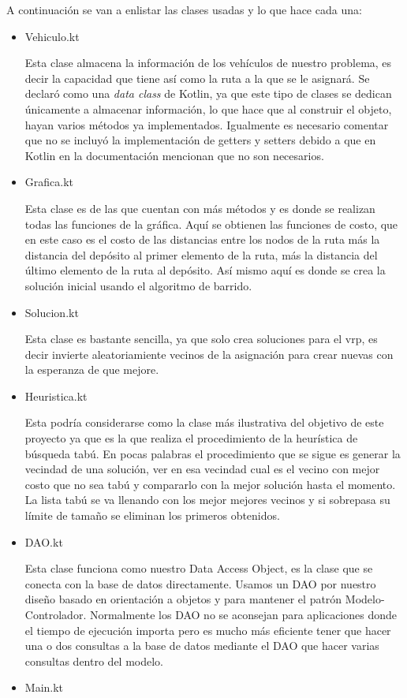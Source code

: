 \documentclass{article}
\begin{document}
A continuación se van a enlistar las clases usadas y lo que hace cada una:
\begin{itemize}
	\item {Vehiculo.kt
		
		Esta clase almacena la información de los vehículos de nuestro problema, es decir la capacidad que tiene así como la ruta a la que se le asignará. Se declaró como una \emph{data class} de Kotlin, ya que este tipo de clases se dedican únicamente a almacenar información, lo que hace que al construir el objeto, hayan varios métodos ya implementados. Igualmente es necesario comentar que no se incluyó la implementación de getters y setters debido a que en Kotlin en la documentación mencionan que no son necesarios.
	}
	\item {Grafica.kt
		
		Esta clase es de las que cuentan con más métodos y es donde se realizan todas las funciones de la gráfica. Aquí se obtienen las funciones de costo, que en este caso es el costo de las distancias entre los nodos de la ruta más la distancia del depósito al primer elemento de la ruta, más la distancia del último elemento de la ruta al depósito. Así mismo aquí es donde se crea la solución inicial usando el algoritmo de barrido.
	}
	\item {Solucion.kt
		
		Esta clase es bastante sencilla, ya que solo crea soluciones para el vrp, es decir invierte aleatoriamiente vecinos de la asignación para crear nuevas con la esperanza de que mejore.
		
	}
	\item {Heuristica.kt
		
		Esta podría considerarse como la clase más ilustrativa del objetivo de este proyecto ya que es la que realiza el procedimiento de la heurística de búsqueda tabú. En pocas palabras el procedimiento que se sigue es generar la vecindad de una solución, ver en esa vecindad cual es el vecino con mejor costo que no sea tabú y compararlo con la mejor solución hasta el momento. La lista tabú se va llenando con los mejor mejores vecinos y si sobrepasa su límite de tamaño se eliminan los primeros obtenidos.
		
	}
	\item {DAO.kt
		
		Esta clase funciona como nuestro Data Access Object, es la clase que se conecta con la base de datos directamente. Usamos un DAO por nuestro diseño basado en orientación a objetos y para mantener el patrón Modelo-Controlador. Normalmente los DAO no se aconsejan para aplicaciones donde el tiempo de ejecución importa pero es mucho más eficiente tener que hacer una o dos consultas a la base de datos mediante el DAO que hacer varias consultas dentro del modelo.
	}
	\item {Main.kt
		
}
\end{itemize}
\end{document}
